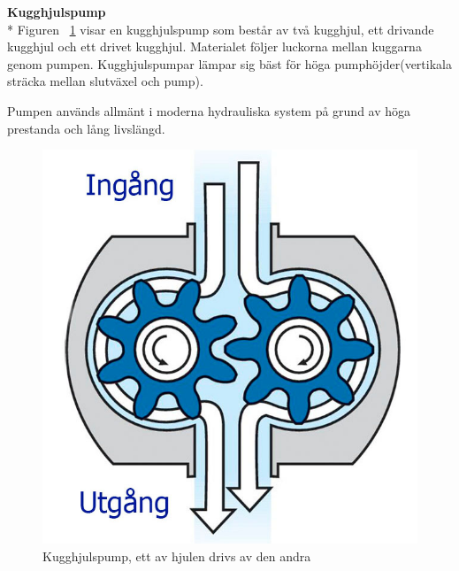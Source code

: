 \newpage
\textbf{Kugghjulspump}\\*
Figuren ~\ref{kugghjulpump} visar en kugghjulspump som består av två kugghjul, ett drivande kugghjul och ett drivet kugghjul.  Materialet följer luckorna mellan kuggarna genom pumpen. Kugghjulspumpar lämpar sig bäst för höga pumphöjder(vertikala sträcka mellan slutväxel och pump)\cite{kugghjul pump}.

Pumpen används allmänt i moderna hydrauliska system på grund av höga prestanda och lång livslängd.

\begin{figure}[h]
	\begin{center}
		\includegraphics[scale=0.25]{images/68637(1).jpg}
		\caption{Kugghjulspump, ett av hjulen drivs av den andra}
		\label{kugghjulpump}	
	\end{center}
\end{figure}